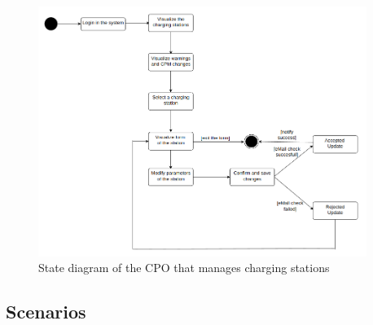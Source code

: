 \begin{figure}[H]
    \centering
    \includegraphics[width=0.95\textwidth]{Images/CPOparams.png}
    \caption{State diagram of the CPO that manages charging stations}
\end{figure}

\subsection{Scenarios}
